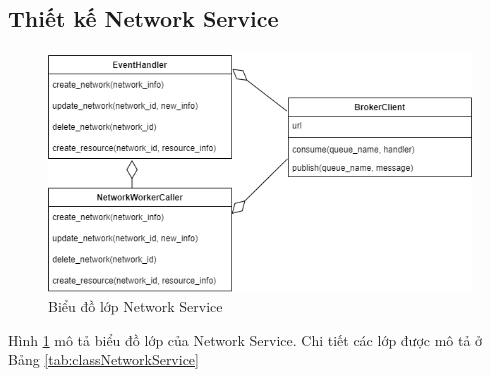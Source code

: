 \documentclass[../DoAn.tex]{subfiles}
\begin{document}
\subsection{Thiết kế Network Service}

\begin{figure}[H]
    \centering
    \includegraphics[width=0.75\linewidth]{Hinhve/DoAn-ClassNetworkService.drawio.png}
    \caption{Biểu đồ lớp Network Service}
    \label{fig:classNetworkService}
\end{figure}

Hình \ref{fig:classNetworkService} mô tả biểu đồ lớp của Network Service. Chi
tiết các lớp được mô tả ở Bảng \ref{tab:classNetworkService}
\end{document}
